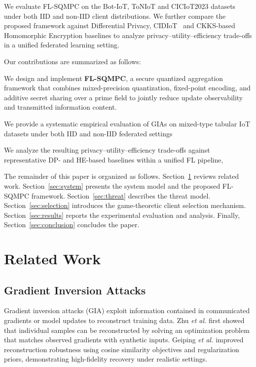 \documentclass[journal,twoside,web]{ieeecolor}
\begin{document}
We evaluate FL-SQMPC on the Bot-IoT, ToNIoT and CICIoT2023 datasets~\cite{moustafa2019botiot,toniot,nader2023ciciot} under both IID and non-IID client distributions. We further compare the proposed framework against Differential Privacy, CIDIoT~\cite{10376416}  and CKKS-based Homomorphic Encryption baselines to analyze privacy--utility--efficiency trade-offs in a unified federated learning setting.

Our contributions are summarized as follows:

We design and implement \textbf{FL-SQMPC}, a secure quantized aggregation framework that combines mixed-precision quantization, fixed-point encoding, and additive secret sharing over a prime field to jointly reduce update observability and transmitted information content.

We provide a systematic empirical evaluation of GIAs on mixed-type tabular IoT datasets under both IID and non-IID federated settings 

We analyze the resulting privacy--utility--efficiency trade-offs against representative DP- and HE-based baselines within a unified FL pipeline, 


The remainder of this paper is organized as follows. Section~\ref{sec:related} reviews related work. Section~\ref{sec:system} presents the system model and the proposed FL-SQMPC framework. Section~\ref{sec:threat} describes the threat model. Section~\ref{sec:selection} introduces the game-theoretic client selection mechanism. Section~\ref{sec:results} reports the experimental evaluation and analysis. Finally, Section~\ref{sec:conclusion} concludes the paper.

\section{Related Work}
\label{sec:related}

\subsection{Gradient Inversion Attacks}

Gradient inversion attacks (GIA) exploit information contained in communicated gradients or model updates to reconstruct training data.
Zhu \textit{et al.} \cite{zhu2019dlg} first showed that individual samples can be reconstructed by solving an optimization problem that matches observed gradients with synthetic inputs. Geiping \textit{et al.} \cite{geiping2020inverting} improved reconstruction robustness using cosine similarity objectives and regularization priors, demonstrating high-fidelity recovery under realistic settings.
 
\end{document}
